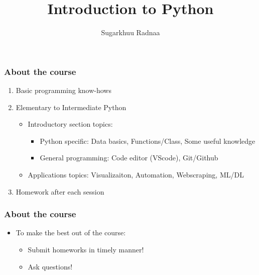 \documentclass{beamer}
\title[Python Intro]{Introduction to Python}
\author{Sugarkhuu Radnaa}
\institute[] 
{
Py4Econ in Ulaanbaatar \\
\medskip
\textit{py4econ@gmail.com} 
}
\date{}
\begin{document}
\begin{frame}
\titlepage 
\end{frame}




\begin{frame}
\frametitle{About the course} 
\begin{enumerate}
    \item Basic programming know-hows
    \item Elementary to Intermediate Python
        \begin{itemize}
            \item Introductory section topics:
            \begin{itemize}
                \item Python specific:  Data basics, Functions/Class, Some useful knowledge
                \item General programming: Code editor (VScode), Git/Github
            \end{itemize}            
            \item Applications topics: Visualizaiton, Automation, Webscraping, ML/DL
        \end{itemize}
    \item Homework after each session
\end{enumerate}

\end{frame}

\begin{frame}
    \frametitle{About the course} %
    \begin{itemize}
        \item To make the best out of the course:
            \begin{itemize}
                \item Submit homeworks in timely manner!
                \item Ask questions!
            \end{itemize}
    \end{itemize}        
\end{frame}
\end{document}
